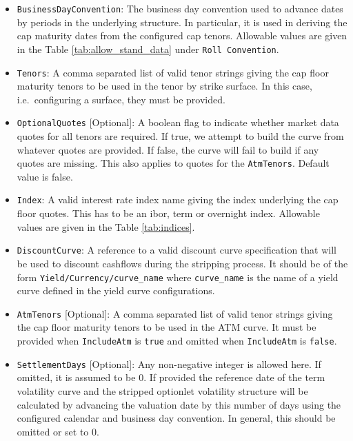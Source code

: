 \begin{itemize}
\item \lstinline!BusinessDayConvention!:
The business day convention used to advance dates by periods in the underlying structure. In particular, it is used in deriving the cap maturity dates from the configured cap tenors. Allowable values are given in the Table \ref{tab:allow_stand_data} under \lstinline!Roll Convention!.

\item \lstinline!Tenors!:
A comma separated list of valid tenor strings giving the cap floor maturity tenors to be used in the tenor by strike surface. In this case, i.e.\ configuring a surface, they must be provided.

\item \lstinline!OptionalQuotes! [Optional]:
A boolean flag to indicate whether market data quotes for all tenors are required. If true, we attempt to build the curve from whatever quotes are provided. If false, the curve will fail to build if any quotes are missing. This also applies to quotes for the \lstinline!AtmTenors!. Default value is false.

\item \lstinline!Index!:
A valid interest rate index name giving the index underlying the cap floor quotes. This has to be an ibor, term or overnight index. Allowable values are given in the Table \ref{tab:indices}.

\item \lstinline!DiscountCurve!:
A reference to a valid discount curve specification that will be used to discount cashflows during the stripping process. It should be of the form \lstinline!Yield/Currency/curve_name! where \lstinline!curve_name! is the name of a yield curve defined in the yield curve configurations.

\item \lstinline!AtmTenors! [Optional]:
A comma separated list of valid tenor strings giving the cap floor maturity tenors to be used in the ATM curve. It must be provided when \lstinline!IncludeAtm! is \lstinline!true! and omitted when \lstinline!IncludeAtm! is \lstinline!false!.

\item \lstinline!SettlementDays! [Optional]:
Any non-negative integer is allowed here. If omitted, it is assumed to be 0. If provided the reference date of the term volatility curve and the stripped optionlet volatility structure will be calculated by advancing the valuation date by this number of days using the configured calendar and business day convention. In general, this should be omitted or set to 0.


\end{itemize}
